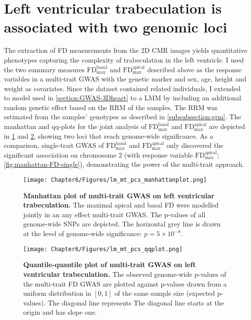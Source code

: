\section{Left ventricular trabeculation is associated with two genomic loci}
The extraction of FD measurements from the 2D CMR images yields quantitative phenotypes capturing the complexity of trabeculation in the left ventricle. I used the two summary measures \(\text{FD}_\text{max}^\text{basal}\) and \(\text{FD}_\text{max}^\text{apical}\) described above as the response variables in a multi-trait GWAS with the genetic marker and sex, age, height and weight as covariates. Since the dataset contained related individuals, I extended to model used in \cref{section:GWAS-3Dheart} to a LMM by including an additional random genetic effect based on the RRM of the samples. The RRM was estimated from the samples' genotypes as described in \cref{subsubsection:grm}. The manhattan and qq-plots for the joint analysis of \(\text{FD}_\text{max}^\text{basal}\) and \(\text{FD}_\text{max}^\text{apical}\) are depicted in \cref{fig:manhattan-FD} and \cref{fig:qq-FD}, showing two loci that reach genome-wide significance. As a comparison, single-trait GWAS of  \(\text{FD}_\text{max}^\text{basal}\) and \(\text{FD}_\text{max}^\text{apical}\) only discovered the significant association on chromosome 2 (with response variable \(\text{FD}_\text{max}^\text{apical}\); \cref{fig:manhattan-FD-single}), demonstrating the power of the multi-trait approach.
%
\begin{figure}[hbtp]
	\centering
	\texttt{[image: Chapter6/Figures/lm\_mt\_pcs\_manhattanplot.png]}
	\caption[\textbf{Manhattan plot of multi-trait GWAS on left ventricular trabeculation. }]{\textbf{Manhattan plot of multi-trait GWAS on left ventricular trabeculation. } The maximal apical and basal FD  were modelled jointly in an any effect multi-trait GWAS. The p-values of all genome-wide SNPs are depicted. The horizontal grey line is drawn at the level of genome-wide significance: \(p = 5 \times 10^{-8}\).} 
	 	\label{fig:manhattan-FD}
\end{figure}
%
\begin{figure}[hbtp]
	\centering
	\texttt{[image: Chapter6/Figures/lm\_mt\_pcs\_qqplot.png]}
	\caption[\textbf{Quantile-quantile plot of multi-trait GWAS on left ventricular trabeculation .}]{\textbf{Quantile-quantile plot of multi-trait GWAS on left ventricular trabeculation.} The observed genome-wide p-values of the multi-trait FD GWAS are plotted against p-values drawn from a uniform distribution in \([0,1]\) of the same sample size (expected p-values). The diagonal line represents The diagonal line starts at the origin and has slope one.} 
	 	\label{fig:qq-FD}
\end{figure}
